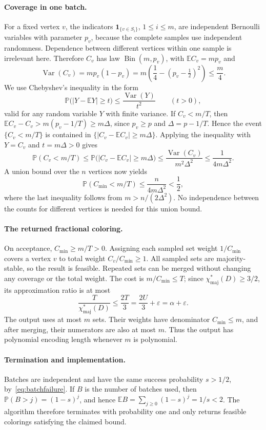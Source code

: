 \documentclass[12pt]{article}
\DeclareMathOperator{\Bin}{Bin}
\newcommand{\Pp}{\mathbb P}
\newcommand{\E}{\mathbb E}
\newcommand{\chif}{\chi^*_{\mathrm{maj}}}
\newcommand{\abs}[1]{|#1|}
\begin{document}
\paragraph{Coverage in one batch.}
For a fixed vertex \(v\), the indicators \(\mathbf1_{\{v\in S_i\}}\), \(1\le i\le m\), are independent Bernoulli variables with parameter \(p_v\), because the complete samples use independent randomness. Dependence between different vertices within one sample is irrelevant here. Therefore \(C_v\) has law \(\Bin(m,p_v)\), with \(\E C_v=mp_v\) and
\[
\operatorname{Var}(C_v)=mp_v(1-p_v)
=m\left(\frac14-(p_v-\tfrac12)^2\right)\le\frac m4.
\]
We use Chebyshev's inequality in the form
\[
\Pp\bigl(\abs{Y-\E Y}\ge t\bigr)
\le\frac{\operatorname{Var}(Y)}{t^2}\qquad(t>0),
\]
valid for any random variable \(Y\) with finite variance. If \(C_v<m/T\), then \(\E C_v-C_v>m(p_v-1/T)\ge m\Delta\), since \(p_v\ge p\) and \(\Delta=p-1/T\). Hence the event \(\{C_v<m/T\}\) is contained in \(\{\abs{C_v-\E C_v}\ge m\Delta\}\). Applying the inequality with \(Y=C_v\) and \(t=m\Delta>0\) gives
\[
\Pp(C_v<m/T)
\le\Pp\bigl(\abs{C_v-\E C_v}\ge m\Delta\bigr)
\le\frac{\operatorname{Var}(C_v)}{m^2\Delta^2}
\le\frac1{4m\Delta^2}.
\]
A union bound over the \(n\) vertices now yields
\begin{equation}\label{eq:batchfailure}
\Pp(C_{\min}<m/T)\le\frac{n}{4m\Delta^2}<\frac12,
\end{equation}
where the last inequality follows from \(m>n/(2\Delta^2)\). No independence between the counts for different vertices is needed for this union bound.

\paragraph{The returned fractional coloring.}
On acceptance, \(C_{\min}\ge m/T>0\). Assigning each sampled set weight \(1/C_{\min}\) covers a vertex \(v\) to total weight \(C_v/C_{\min}\ge1\). All sampled sets are majority-stable, so the result is feasible. Repeated sets can be merged without changing any coverage or the total weight. The cost is \(m/C_{\min}\le T\); since \(\chif(D)\ge3/2\), its approximation ratio is at most
\[
\frac{T}{\chif(D)}\le\frac{2T}{3}
=\frac{2U}{3}+\varepsilon=\alpha+\varepsilon.
\]
The output uses at most \(m\) sets. Their weights have denominator \(C_{\min}\le m\), and after merging, their numerators are also at most \(m\). Thus the output has polynomial encoding length whenever \(m\) is polynomial.

\paragraph{Termination and implementation.}
Batches are independent and have the same success probability \(s>1/2\), by~\eqref{eq:batchfailure}. If \(B\) is the number of batches used, then \(\Pp(B>j)=(1-s)^j\), and hence \(\E B=\sum_{j\ge0}(1-s)^j=1/s<2\). The algorithm therefore terminates with probability one and only returns feasible colorings satisfying the claimed bound.
\end{document}

